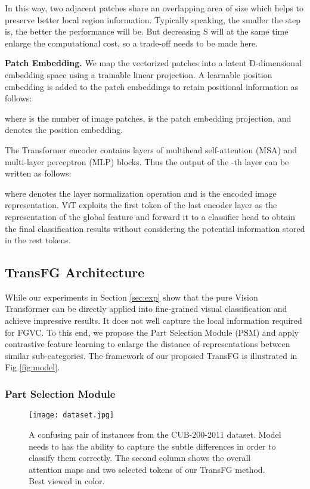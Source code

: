 \documentclass[10pt,twocolumn,letterpaper]{article}
\begin{document}
In this way, two adjacent patches share an overlapping area of size  which helps to preserve better local region information. Typically speaking, the smaller the step  is, the better the performance will be. But decreasing S will at the same time enlarge the computational cost, so a trade-off needs to be made here.

\textbf{Patch Embedding.} We map the vectorized patches  into a latent D-dimensional embedding space using a trainable linear projection. A learnable position embedding is added to the patch embeddings to retain positional information as follows:

where  is the number of image patches,  is the patch embedding projection, and  denotes the position embedding.

The Transformer encoder \cite{vaswani2017attention} contains  layers of multihead self-attention (MSA) and multi-layer perceptron (MLP) blocks. Thus the output of the -th layer can be written as follows:

where  denotes the layer normalization operation and  is the encoded image representation. ViT exploits the first token of the last encoder layer  as the representation of the global feature and forward it to a classifier head to obtain the final classification results without considering the potential information stored in the rest tokens.

\subsection{TransFG Architecture}
\label{sec:TransFG}

While our experiments in Section \ref{sec:exp} show that the pure Vision Transformer can be directly applied into fine-grained visual classification and achieve impressive results. It does not well capture the local information required for FGVC. To this end, we propose the Part Selection Module (PSM) and apply contrastive feature learning to enlarge the distance of representations between similar sub-categories. The framework of our proposed TransFG is illustrated in Fig \ref{fig:model}.

\subsubsection{Part Selection Module}

\begin{figure}
    \centering
    \texttt{[image: dataset.jpg]}
    \caption{A confusing pair of instances from the CUB-200-2011 dataset. Model needs to has the ability to capture the subtle differences in order to classify them correctly. The second column shows the overall attention maps and two selected tokens of our TransFG method. Best viewed in color.}
    \label{fig:dataset}
\end{figure}
\end{document}
